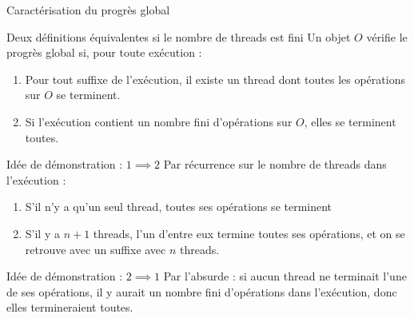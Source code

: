 \begin{frame}{Caractérisation du progrès global}

  \begin{block}{Deux définitions équivalentes si le nombre de threads est fini}
    Un objet $O$ vérifie le progrès global si, pour toute exécution :
    \begin{enumerate}
    \item Pour tout suffixe de l'exécution, il existe un thread dont toutes les opérations sur $O$ se terminent.
    \item Si l'exécution contient un nombre fini d'opérations sur $O$, elles se terminent toutes.
    \end{enumerate}
  \end{block}

  \begin{exampleblock}{Idée de démonstration : $1 \implies 2$}
    Par récurrence sur le nombre de threads dans l'exécution :
    \begin{enumerate}
    \item S'il n'y a qu'un seul thread, toutes ses opérations se terminent
    \item S'il y a $n+1$ threads, l'un d'entre eux termine toutes ses opérations,
      et on se retrouve avec un suffixe avec $n$ threads. 
    \end{enumerate}
  \end{exampleblock}

  \begin{exampleblock}{Idée de démonstration : $2 \implies 1$}
    Par l'absurde : si aucun thread ne terminait l'une de ses opérations, il y aurait un nombre fini d'opérations dans l'exécution, donc elles termineraient toutes. 
  \end{exampleblock}

\end{frame}

